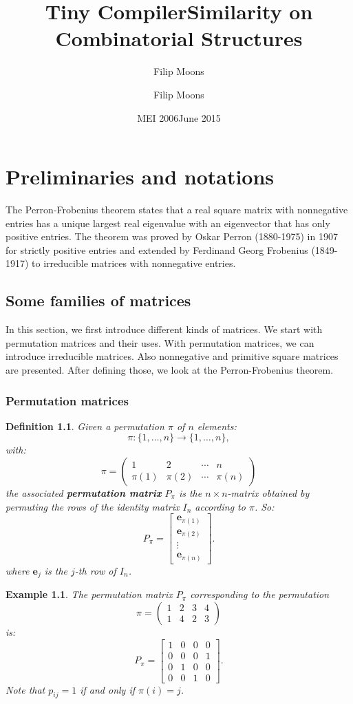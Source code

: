 \documentclass[a4paper,11pt]{report}
\author{Filip Moons}
\title{Tiny Compiler}
\author{Filip Moons}
\title{Similarity on Combinatorial Structures}
\date{MEI 2006}
\date{June 2015}
\newtheorem{example}[theorem]{Example}
\newtheorem{definition}[theorem]{Definition}
\begin{document}
\maketitlepage


\tableofcontents
\newpage
\chapter{Preliminaries and notations}


The Perron-Frobenius theorem states that a real square matrix with nonnegative entries has a unique largest real eigenvalue with an eigenvector 
that has only positive entries. The theorem was proved by Oskar 
Perron (1880-1975) in 1907 for strictly positive entries and extended by 
Ferdinand Georg Frobenius (1849-1917) to irreducible matrices with nonnegative 
entries. 

\section{Some families of matrices}
In this section, we first introduce different kinds of matrices. We start with permutation matrices and their uses. 
With permutation matrices, we can introduce irreducible matrices. Also nonnegative and primitive square matrices are presented. After defining 
those, we look at the Perron-Frobenius theorem. 
\subsection{Permutation matrices}
\begin{definition}
  Given a permutation $\pi$ of $n$ elements:
  $$\pi: \{1,\ldots,n\} \to \{1,\ldots,n\},$$
  with:
    $$\pi = \begin{pmatrix} 1 & 2 & \cdots & n \\ \pi(1) & \pi(2) & \cdots & \pi(n) \end{pmatrix} $$
  the associated \textbf{permutation matrix} $P_\pi$ is the $n\times n$-matrix 
  obtained by permuting the rows of the identity matrix $I_n$ according to $\pi$. 
  So:
 $$P_\pi = \begin{bmatrix} 
\mathbf{e}_{\pi(1)}  \\
\mathbf{e}_{\pi(2)}  \\
\vdots  \\
\mathbf{e}_{\pi(n)}  
\end{bmatrix}.$$
 where $\mathbf{e}_{j}$ is the $j$-th row of $I_n$.
 \end{definition}
\begin{example}
  The permutation matrix $P_\pi$ corresponding to the permutation  $$\pi = \begin{pmatrix} 1 & 2 & 3 & 4 \\ 1 & 4 & 2 & 3 \end{pmatrix} $$
  is:
  $$P_\pi = \begin{bmatrix} 
1 & 0 & 0 & 0  \\
0 & 0 & 0 & 1  \\
0 & 1 & 0 & 0  \\
0 & 0 & 1 & 0  
\end{bmatrix}.$$
Note that $p_{ij} = 1$ if and only if $\pi(i) = j$. 
\end{example}
\end{document}
